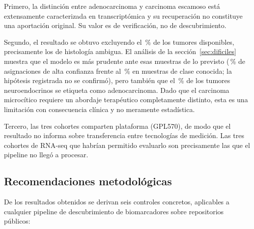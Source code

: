 Primero, la distinción entre adenocarcinoma y carcinoma escamoso está
extensamente caracterizada en transcriptómica y su recuperación no constituye una
aportación original. Su valor es de verificación, no de descubrimiento.

Segundo, el resultado se obtuvo excluyendo el \pctexcluidas\,\% de los tumores
disponibles, precisamente los de histología ambigua. El análisis de la
sección~\ref{sec:dificiles} muestra que el modelo es más prudente ante esas
muestras de lo previsto (\pctconfambiguas\,\% de asignaciones de alta confianza frente al
\pctconfvistas\,\% en muestras de clase conocida; la hipótesis registrada no se confirmó),
pero también que el \pctneuroadc\,\% de los \nneuro{} tumores neuroendocrinos se etiqueta como
adenocarcinoma. Dado que el carcinoma microcítico requiere un abordaje
terapéutico completamente distinto, esta es una limitación con consecuencia
clínica y no meramente estadística.

Tercero, las tres cohortes comparten plataforma (GPL570), de modo que el
resultado no informa sobre transferencia entre tecnologías de medición. Las tres
cohortes de RNA-seq que habrían permitido evaluarlo son precisamente las que el
pipeline no llegó a procesar.

\subsection{Recomendaciones metodológicas}
\label{sec:disc-recomendaciones}

De los resultados obtenidos se derivan seis controles concretos, aplicables a
cualquier pipeline de descubrimiento de biomarcadores sobre repositorios
públicos:

